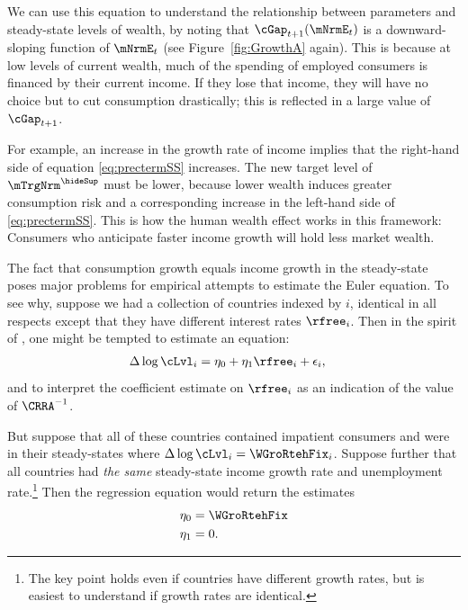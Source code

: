 \documentclass{econark}
\begin{document}
We can use this equation to understand the relationship between
parameters and steady-state levels of wealth, by noting that
$\cGap_{t+1}(\mNrmE_{t})$ is a downward-sloping function of
$\mNrmE_{t}$ (see Figure~\ref{fig:GrowthA} again).  This is because at
low levels of current wealth, much of the spending of employed
consumers is financed by their current income.  If they lose that
income, they will have no choice but to cut consumption drastically; this is
reflected in a large value of $\cGap_{t+1}$.

For example, an increase in the growth rate of income implies that the
right-hand side of equation \eqref{eq:prectermSS} increases.  The new target level of
$\mTrgNrm^{\hideSup}$ must be lower, because lower wealth induces greater consumption risk and a corresponding increase in the left-hand side of \eqref{eq:prectermSS}.  This is how the human wealth effect works in this framework:
Consumers who anticipate faster income growth will hold less market wealth.

The fact that consumption growth equals income growth in the
steady-state poses major problems for empirical attempts to estimate
the Euler equation.  To see why, suppose we had a collection of
countries indexed by $i$, identical in all respects except that
they have different interest rates $\rfree_{i}$.
Then in the spirit of \cite{hallSubstitution}, one might be
tempted to estimate an equation:
\begin{equation}\begin{gathered}\begin{aligned}
        \Delta \log \cLvl_{i} & =  \eta_{0} + \eta_{1} \rfree_{i}+\epsilon_{i},
\end{aligned}\end{gathered}\end{equation}
and to interpret the coefficient estimate on $\rfree_{i}$ as an indication
of the value of $\CRRA^{-1}$.

But suppose that all of these countries contained impatient consumers
and were in their steady-states where $\Delta \log \cLvl_{i} = \WGroRtehFix_{i}$.
Suppose further
that all countries had {\it the same} steady-state income growth rate and
unemployment rate.\footnote{The key point holds even if countries have different
growth rates, but is easiest to understand if growth rates are identical.}
Then the regression equation would return the estimates
\begin{equation}\begin{gathered}\begin{aligned}
        \eta_{0} & =  \WGroRtehFix  \\
        \eta_{1} & =  0.
\end{aligned}\end{gathered}\end{equation}
\end{document}
